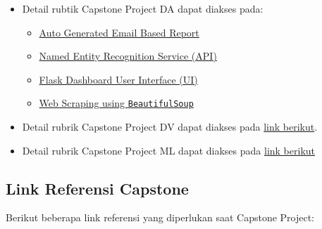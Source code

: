 \documentclass[
]{book}
\providecommand{\tightlist}{%
  \setlength{\itemsep}{0pt}\setlength{\parskip}{0pt}}
\begin{document}
\begin{itemize}
\item
  Detail rubtik Capstone Project DA dapat diakses pada:

  \begin{itemize}
  \tightlist
  \item
    \href{https://github.com/ttnsy/fire-capstone}{Auto Generated Email Based Report}
  \item
    \href{https://github.com/iqbalbasyar/ner-flask}{Named Entity Recognition Service (API)}
  \item
    \href{https://github.com/fafilia/capstone-UIFlask}{Flask Dashboard User Interface (UI)}
  \item
    \href{https://github.com/t3981-h/BeautifulSoup-Capstone}{Web Scraping using \texttt{BeautifulSoup}}
  \end{itemize}
\item
  Detail rubrik Capstone Project DV dapat diakses pada \href{https://rpubs.com/AlgoritmaAcademy/dv-capstone}{link berikut}.
\item
  Detail rubrik Capstone Project ML dapat diakses pada \href{https://rpubs.com/AlgoritmaAcademy/ml-capstone}{link berikut}
\end{itemize}

\hypertarget{link-referensi-capstone}{%
\subsection{Link Referensi Capstone}\label{link-referensi-capstone}}

Berikut beberapa link referensi yang diperlukan saat Capstone Project:
\end{document}
